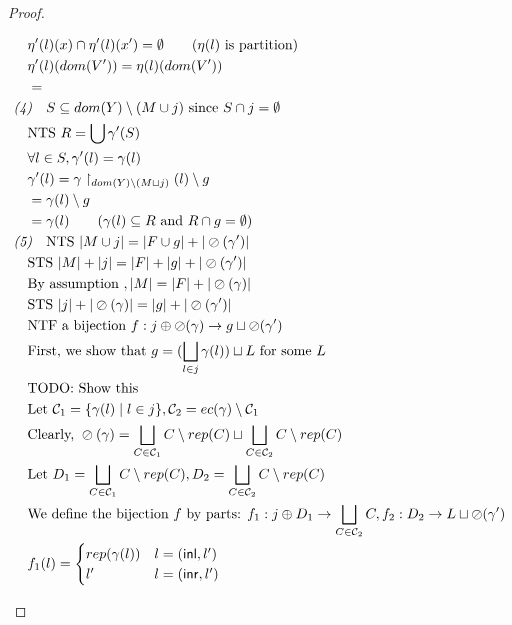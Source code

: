 \documentclass[11pt]{article}
\newcommand{\ms}[1]{\ensuremath{\mathsf{#1}}}
\newcommand{\oh}[1]{\oslash(#1)}
\theoremstyle{definition}
\begin{document}
\begin{proof}
\begin{description}
\begin{align*}
		&\quad \eta'(l)(x) \cap \eta'(l)(x') = \emptyset \tag{$\eta(l)$ is partition}\\
		&\quad \eta'(l)(dom(V')) = \eta(l)(dom(V'))\\
		&\quad = \\
		&\emph{(4)}\quad S \subseteq dom(Y) \setminus (M \cup j) \text{ since } S \cap j = \emptyset\\
		&\quad \text{NTS } R = \bigcup \gamma'(S)\\
		&\quad \forall l \in S, \gamma'(l) = \gamma(l)\\
		&\quad \gamma'(l) = \gamma \restriction_{dom(Y)\setminus(M \sqcup j)}(l) \setminus g\\
		&\quad = \gamma(l) \setminus g\\
		&\quad = \gamma(l) \tag{$\gamma(l) \subseteq R$ and $R \cap g = \emptyset$}\\
		&\emph{(5)}\quad \text{NTS } |M \cup j| = |F \cup g| + |\oh{\gamma'}|\\
		&\quad \text{STS } |M| + |j| = |F| + | g| + |\oh{\gamma'}|\\
		&\quad \text{By assumption }, |M| = |F| + |\oh{\gamma}|\\
		&\quad \text{STS } |j| + |\oh{\gamma}| = |g| + |\oh{\gamma'}|\\
		&\quad \text{NTF a bijection } f : j \oplus \oh{\gamma} \to g \sqcup \oh{\gamma'}\\
		&\quad \text{First, we show that } g = (\bigsqcup_{l \in j} \gamma(l)) \sqcup L \text{ for some } L\\
		&\quad \text{TODO: Show this }\\
		&\quad \text{Let } \mathcal{C}_1 = \{\gamma(l) \mid l \in j\},
				\mathcal{C}_2 = ec(\gamma) \setminus \mathcal{C}_1\\
		&\quad \text{Clearly, } \oh{\gamma} = 
		\bigsqcup_{C  \in \mathcal{C}_1} C \setminus rep(C) \sqcup \bigsqcup_{C  \in \mathcal{C}_2} C \setminus rep(C)\\
		&\quad \text{Let } D_1 = \bigsqcup_{C  \in \mathcal{C}_1} C \setminus rep(C), 
		D_2 = \bigsqcup_{C  \in \mathcal{C}_2} C \setminus rep(C)\\
		&\quad \text{We define the bijection } 
			f \text{ by parts: } 
			f_1 : j \oplus D_1 \to \bigsqcup_{C \in \mathcal{C}_2} C, f_2 : D_2 \to L \sqcup \oh{\gamma'}\\
		&\quad f_1(l) =  
		\begin{cases}
			rep(\gamma(l)) &l = (\ms{inl},l')\\
			l' &l = (\ms{inr},l')
		\end{cases}\\

\end{align*}
\end{description}
\end{proof}
\end{document}
